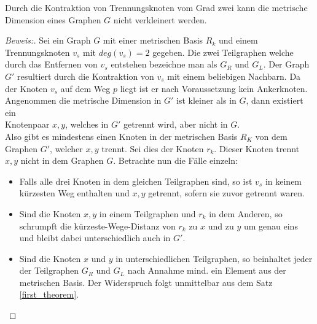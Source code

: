 \begin{lem}
\label{sepvertex2}
Durch die Kontraktion von Trennungsknoten vom Grad zwei kann die metrische Dimension eines Graphen $G$ nicht verkleinert werden.
\end{lem}
\begin{proof}[Beweis:]
Sei ein Graph $G$ mit einer metrischen Basis $R_k$ und einem Trennungsknoten $v_s$ mit $deg(v_s)=2$ gegeben. Die zwei Teilgraphen welche durch das Entfernen von $v_s$ entstehen bezeichne man als $G_R$ und $G_L$.
Der Graph $G'$ resultiert durch die Kontraktion von $v_s$ mit einem beliebigen Nachbarn. Da der Knoten $v_s$ auf dem Weg $p$ liegt ist er nach Voraussetzung kein Ankerknoten.\newline
Angenommen die metrische Dimension in $G'$ ist kleiner als in $G$, dann existiert ein\\Knotenpaar $x,y$, welches in $G'$ getrennt wird, aber nicht in $G$.\\Also gibt es mindestens einen Knoten in der metrischen Basis $R_K$ von dem Graphen $G'$, welcher $x,y$ trennt. Sei dies der Knoten $r_k$. Dieser Knoten trennt $x,y$ nicht in dem Graphen $G$. 
Betrachte nun die Fälle einzeln:
\begin{itemize}
\item Falls alle drei Knoten in dem gleichen Teilgraphen sind, so ist $v_s$ in keinem kürzesten Weg enthalten und $x,y$ getrennt, sofern sie zuvor getrennt waren.
\item Sind die Knoten $x,y$ in einem Teilgraphen und $r_k$ in dem Anderen, so schrumpft die kürzeste-Wege-Distanz von $r_k$ zu $x$ und zu $y$ um genau eins und bleibt dabei unterschiedlich auch in $G'$.
\item Sind die Knoten $x$ und $y$ in unterschiedlichen Teilgraphen, so beinhaltet jeder der Teilgraphen $G_R$ und $G_L$ nach Annahme mind. ein Element aus der metrischen Basis. Der Widerspruch folgt unmittelbar aus dem Satz \ref{first_theorem}.
\end{itemize}
\end{proof}
